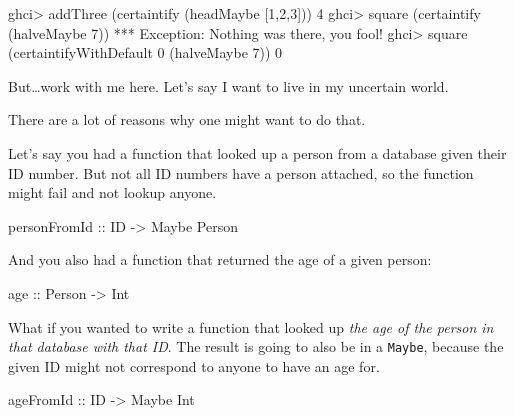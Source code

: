 \documentclass[]{article}
\newenvironment{Shaded}{}{}
\newcommand{\DataTypeTok}[1]{\textcolor[rgb]{0.56,0.13,0.00}{{#1}}}
\newcommand{\DecValTok}[1]{\textcolor[rgb]{0.25,0.63,0.44}{{#1}}}
\newcommand{\OtherTok}[1]{\textcolor[rgb]{0.00,0.44,0.13}{{#1}}}
\newcommand{\FunctionTok}[1]{\textcolor[rgb]{0.02,0.16,0.49}{{#1}}}
\newcommand{\NormalTok}[1]{{#1}}
\begin{document}
\begin{Shaded}
\begin{Highlighting}[]
\NormalTok{ghci}\FunctionTok{>} \NormalTok{addThree (certaintify (headMaybe [}\DecValTok{1}\NormalTok{,}\DecValTok{2}\NormalTok{,}\DecValTok{3}\NormalTok{]))}
\DecValTok{4}
\NormalTok{ghci}\FunctionTok{>} \NormalTok{square (certaintify (halveMaybe }\DecValTok{7}\NormalTok{))}
\FunctionTok{***} \DataTypeTok{Exception}\FunctionTok{:} \DataTypeTok{Nothing} \NormalTok{was there, you fool}\FunctionTok{!}
\NormalTok{ghci}\FunctionTok{>} \NormalTok{square (certaintifyWithDefault }\DecValTok{0} \NormalTok{(halveMaybe }\DecValTok{7}\NormalTok{))}
\DecValTok{0}
\end{Highlighting}
\end{Shaded}

But\ldots{}work with me here. Let's say I want to live in my uncertain
world.

There are a lot of reasons why one might want to do that.

Let's say you had a function that looked up a person from a database
given their ID number. But not all ID numbers have a person attached, so
the function might fail and not lookup anyone.

\begin{Shaded}
\begin{Highlighting}[]
\OtherTok{personFromId ::} \DataTypeTok{ID} \OtherTok{->} \DataTypeTok{Maybe} \DataTypeTok{Person}
\end{Highlighting}
\end{Shaded}

And you also had a function that returned the age of a given person:

\begin{Shaded}
\begin{Highlighting}[]
\OtherTok{age ::} \DataTypeTok{Person} \OtherTok{->} \DataTypeTok{Int}
\end{Highlighting}
\end{Shaded}

What if you wanted to write a function that looked up \emph{the age of
the person in that database with that ID}. The result is going to also
be in a \texttt{Maybe}, because the given ID might not correspond to
anyone to have an age for.

\begin{Shaded}
\begin{Highlighting}[]
\OtherTok{ageFromId ::} \DataTypeTok{ID} \OtherTok{->} \DataTypeTok{Maybe} \DataTypeTok{Int}
\end{Highlighting}
\end{Shaded}
\end{document}
